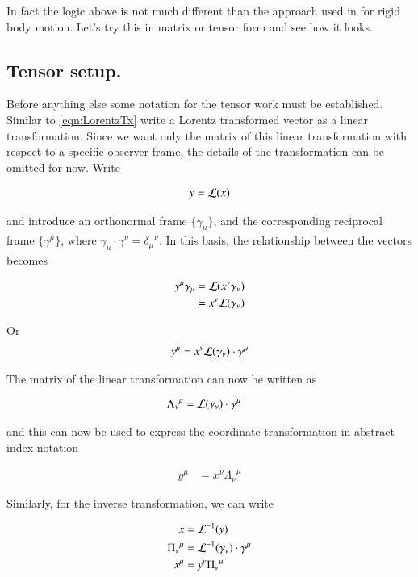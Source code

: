 \documentclass{article}
\newcommand{\ILambda}[0]{\Pi}
\begin{document}
In fact
the logic above is not much different than the approach used in \cite{TongDynamics} for rigid body motion.  Let's try this in matrix or tensor
form and see how it looks.

\subsection{ Tensor setup. }

Before anything else some notation for the tensor work must be established.  Similar to \ref{eqn:LorentzTx} write a Lorentz transformed vector as a 
linear transformation.  Since we want only the matrix of this linear transformation with respect to a specific observer frame, the details
of the transformation can be omitted for now.  Write

\begin{align}
y = \mathcal{L}(x)
\end{align}

and introduce an orthonormal frame $\{\gamma_\mu\}$, and the corresponding reciprocal frame
$\{\gamma^\mu\}$, where $\gamma_\mu \cdot \gamma^\nu = {\delta_\mu}^\nu$.
In this basis, the relationship between the vectors becomes

\begin{align*}
y^\mu \gamma_\mu 
&= \mathcal{L}(x^\nu \gamma_\nu) \\
&= x^\nu \mathcal{L}(\gamma_\nu) \\
\end{align*}

Or
\begin{align*}
y^\mu &= x^\nu \mathcal{L}(\gamma_\nu) \cdot \gamma^\mu \\
\end{align*}

The matrix of the linear transformation can now be written as

\begin{align}
{\Lambda_\nu}^\mu &= \mathcal{L}(\gamma_\nu) \cdot \gamma^\mu
\end{align}

and this can now be used to express the coordinate transformation in abstract index notation

\begin{align}
y^\mu &= x^\nu {\Lambda_\nu}^\mu 
\end{align}

Similarly, for the inverse transformation, we can write

\begin{align}
x &= \LL^{-1}(y) \\
{\ILambda_\nu}^\mu &= \LL^{-1}(\gamma_\nu) \cdot \gamma^\mu \\
x^\mu &= y^\nu {\ILambda_\nu}^\mu 
\end{align}
\end{document}
